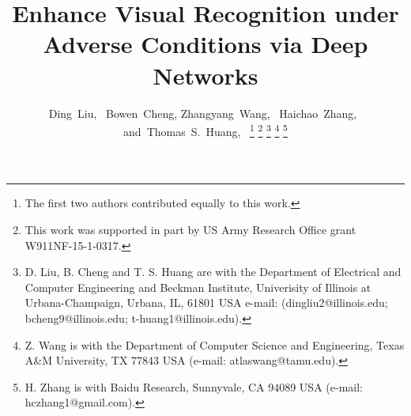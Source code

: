 \documentclass[10pt,twocolumn,twoside]{IEEEtran} %
\begin{document}
%

\title{Enhance Visual Recognition under Adverse Conditions via Deep Networks}
%
%
%

\author{Ding~Liu,~
        Bowen~Cheng,
        Zhangyang~Wang,~
        Haichao~Zhang,~
        and~Thomas~S.~Huang,~%
\thanks{The first two authors contributed equally to this work.}
\thanks{This work was supported in part by US Army Research Office grant W911NF-15-1-0317.}
\thanks{D. Liu, B. Cheng and T. S. Huang are with the Department
of Electrical and Computer Engineering and Beckman Institute, Univerisity of Illinois at Urbana-Champaign, Urbana,
IL, 61801 USA e-mail: (dingliu2@illinois.edu; bcheng9@illinois.edu; t-huang1@illinois.edu).}%
\thanks{Z. Wang is with the Department of Computer Science and Engineering, Texas A\&M University, TX 77843 USA (e-mail: atlaswang@tamu.edu).}
\thanks{H. Zhang is with Baidu Research, Sunnyvale, CA 94089 USA (e-mail: hczhang1@gmail.com).}
}
\end{document}
